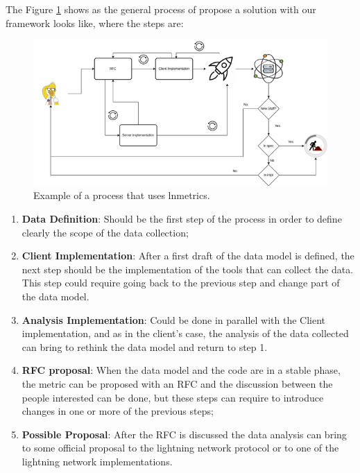 The Figure \ref{fig:lnmetrics_process} shows as the general process of propose 
a solution with our framework looks like, where the steps are:

\begin{figure}
    \begin{center}
      \includegraphics[scale=0.7]{imgs/lnmetrics-workflow-drawio.png}
    \end{center}
    \caption{Example of a process that uses lnmetrics.}
    \label{fig:lnmetrics_process}
\end{figure}

\begin{enumerate}
    \item {\bf Data Definition}: Should be the first step of the process in order
        to define clearly the scope of the data collection;
    \item {\bf Client Implementation}: After a first draft of the data model is defined,
        the next step should be the implementation of the tools that can collect 
        the data. This step could require going back to the previous step and change 
        part of the data model.
    \item {\bf Analysis Implementation}: Could be done in parallel with the Client implementation,
        and as in the client's case, the analysis of the data collected can bring to rethink the data model
        and return to step 1.
    \item {\bf RFC proposal}: When the data model and the code are in a stable phase,
        the metric can be proposed with an RFC and the discussion between the people interested
        can be done, but these steps can require to introduce changes in one or more of the previous steps;
    \item {\bf Possible Proposal}: After the RFC is discussed the data analysis can bring to some 
        official proposal to the lightning network protocol or to one of the lightning network implementations.
\end{enumerate}

